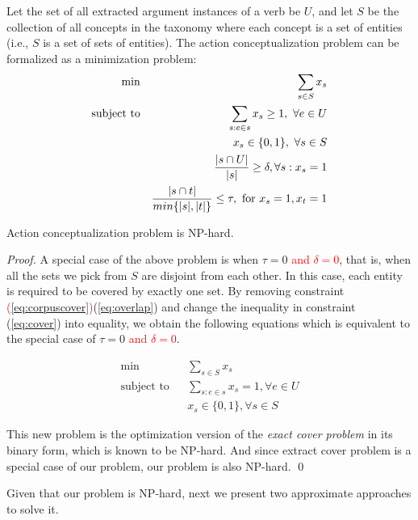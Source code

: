 Let the set of all extracted argument instances of a verb be $U$, and
let $S$ be the collection of all concepts in the taxonomy where each concept
is a set of entities (i.e., $S$ is a set of sets of entities). The
action conceptualization problem can be formalized as
a minimization problem:
\begin{eqnarray}
\min && \sum_{s\in S} x_s \\
\rm{subject~to} && \sum_{s:e\in s} x_s \ge 1,\ \forall e \in U \label{eq:cover}\\
&& x_s\in \{0,1\},\ \forall s \in S \label{eq:binary} \\
&& \frac{|s\cap U|}{|s|} \ge \delta, \forall s:x_s=1 \label{eq:corpuscover}\\
&& \frac{|s\cap t|}{min\{ |s|,|t| \}} \le \tau,\ \mbox{for~}  x_s=1, x_t=1
\label{eq:overlap}
\end{eqnarray}

\begin{lemma}
Action conceptualization problem is NP-hard.
\end{lemma}

\begin{proof}
A special case of the above problem is
when $\tau = 0$ \textcolor{red}{and $\delta=0$}, that is,  when all the sets we pick from $S$
are disjoint from each other.
In this case, each entity is required to be covered by exactly one set.
By removing constraint \textcolor{red}{(\ref{eq:corpuscover})}(\ref{eq:overlap})
and change the inequality in constraint (\ref{eq:cover})
into equality, we obtain the following equations which is equivalent to
the special case of $\tau=0$ \textcolor{red}{and $\delta=0$}.

\begin{eqnarray}
\min && \sum_{s\in S} x_s \\
\mbox{subject~to} && \sum_{s:e\in s} x_s = 1, \forall e \in U \\
&& x_s\in \{0,1\}, \forall s \in S
\end{eqnarray}

This new problem is the optimization version of the
{\em exact cover problem} \cite{karp72} in its binary form,
which is known to be NP-hard.
And since extract cover problem is a special case of our problem,
our problem is also NP-hard.
\qed
\end{proof}
Given that our problem is NP-hard, next we present two approximate
approaches to solve it.
